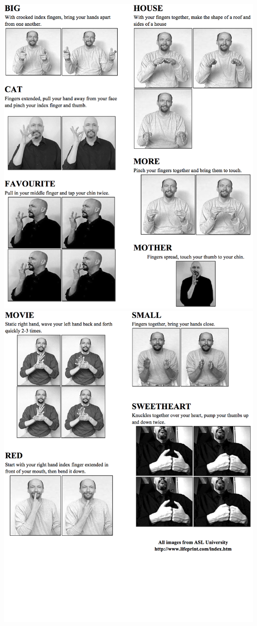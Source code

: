 \documentclass[12pt]{article}
\begin{document}
\newpage
{}
  \includegraphics[scale=0.9]{signs1.png}
  \newpage
  \includegraphics[scale=0.9]{signs2.png}
\end{document}
